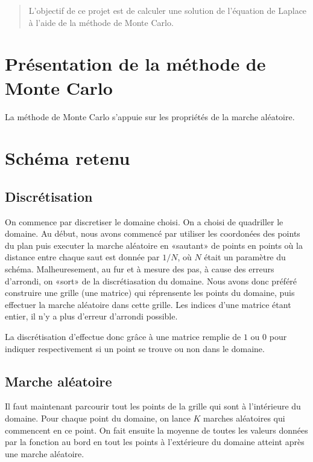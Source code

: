 \documentclass[11pt, a4paper]{article}
\begin{document}

\begin{abstract}
	L'objectif de ce projet est de calculer une solution de l'équation de Laplace à l'aide de la
	méthode de Monte Carlo.
\end{abstract}

\section{Présentation de la méthode de Monte Carlo}

La méthode de Monte Carlo s'appuie sur les propriétés de la marche aléatoire. 

\section{Schéma retenu}

\subsection{Discrétisation}
On commence par discretiser le domaine choisi. On a choisi de quadriller le domaine.  Au début, nous
avons commencé par utiliser les coordonées des points du plan puis executer la marche aléatoire en
«sautant» de points en points où la distance entre chaque saut est donnée par $1/N$, où $N$ était un
paramètre du schéma.  Malheuresement, au fur et à mesure des pas, à cause des erreurs d'arrondi, on
«sort» de la discrétiasation du domaine. Nous avons donc préféré construire une grille (une matrice)
qui réprensente les points du domaine, puis effectuer la marche aléatoire dans cette grille. Les
indices d'une matrice étant entier, il n'y a plus d'erreur d'arrondi possible.

La discrétisation d'effectue donc grâce à une matrice remplie de $1$ ou $0$ pour indiquer
respectivement si un point se trouve ou non dans le domaine.

\subsection{Marche aléatoire}

Il faut maintenant parcourir tout les points de la grille qui sont à l'intérieure du domaine.
Pour chaque point du domaine, on lance $K$  marches aléatoires qui commencent en ce point. On fait
ensuite la moyenne de toutes les valeurs données par la fonction au bord en tout les points à
l'extérieure du domaine atteint après une marche aléatoire.
\end{document}
